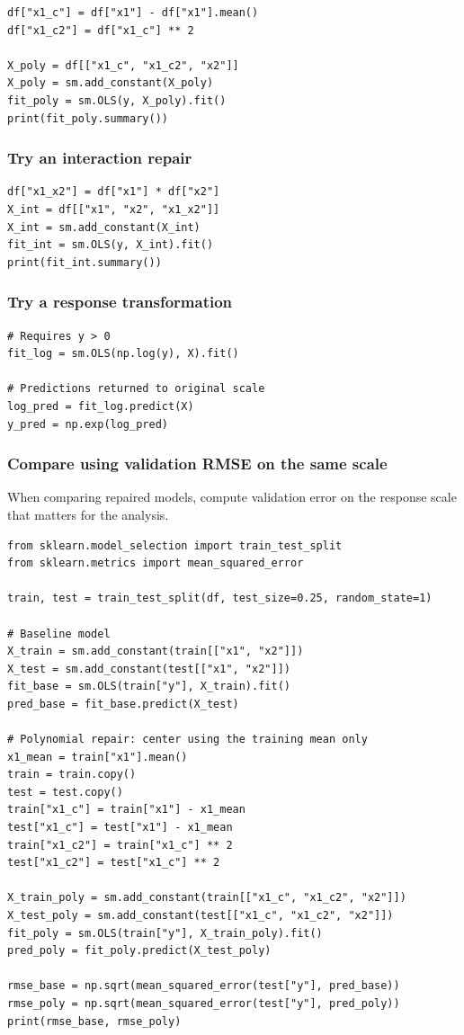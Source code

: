 \begin{verbatim}
df["x1_c"] = df["x1"] - df["x1"].mean()
df["x1_c2"] = df["x1_c"] ** 2

X_poly = df[["x1_c", "x1_c2", "x2"]]
X_poly = sm.add_constant(X_poly)
fit_poly = sm.OLS(y, X_poly).fit()
print(fit_poly.summary())
\end{verbatim}

\subsubsection*{Try an interaction repair}

\begin{verbatim}
df["x1_x2"] = df["x1"] * df["x2"]
X_int = df[["x1", "x2", "x1_x2"]]
X_int = sm.add_constant(X_int)
fit_int = sm.OLS(y, X_int).fit()
print(fit_int.summary())
\end{verbatim}

\subsubsection*{Try a response transformation}

\begin{verbatim}
# Requires y > 0
fit_log = sm.OLS(np.log(y), X).fit()

# Predictions returned to original scale
log_pred = fit_log.predict(X)
y_pred = np.exp(log_pred)
\end{verbatim}

\subsubsection*{Compare using validation RMSE on the same scale}

When comparing repaired models, compute validation error on the response scale that matters for the analysis.

\begin{verbatim}
from sklearn.model_selection import train_test_split
from sklearn.metrics import mean_squared_error

train, test = train_test_split(df, test_size=0.25, random_state=1)

# Baseline model
X_train = sm.add_constant(train[["x1", "x2"]])
X_test = sm.add_constant(test[["x1", "x2"]])
fit_base = sm.OLS(train["y"], X_train).fit()
pred_base = fit_base.predict(X_test)

# Polynomial repair: center using the training mean only
x1_mean = train["x1"].mean()
train = train.copy()
test = test.copy()
train["x1_c"] = train["x1"] - x1_mean
test["x1_c"] = test["x1"] - x1_mean
train["x1_c2"] = train["x1_c"] ** 2
test["x1_c2"] = test["x1_c"] ** 2

X_train_poly = sm.add_constant(train[["x1_c", "x1_c2", "x2"]])
X_test_poly = sm.add_constant(test[["x1_c", "x1_c2", "x2"]])
fit_poly = sm.OLS(train["y"], X_train_poly).fit()
pred_poly = fit_poly.predict(X_test_poly)

rmse_base = np.sqrt(mean_squared_error(test["y"], pred_base))
rmse_poly = np.sqrt(mean_squared_error(test["y"], pred_poly))
print(rmse_base, rmse_poly)
\end{verbatim}

